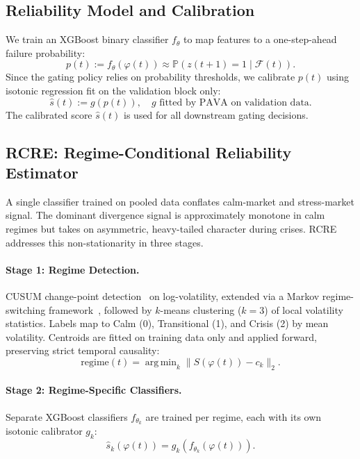 \documentclass[sigconf, anonymous]{acmart}
\begin{document}
\subsection{Reliability Model and Calibration}
We train an XGBoost binary classifier $f_{\theta}$ to map features to a one-step-ahead failure probability:
\begin{equation}
p(t) := f_{\theta}(\varphi(t)) \approx \mathbb{P}(z(t + 1) = 1 \mid \mathcal{F}(t)).
\end{equation}
Since the gating policy relies on probability thresholds, we calibrate $p(t)$ using isotonic regression fit on the validation block only:
\begin{equation}
\hat{s}(t) := g(p(t)), \quad g \text{ fitted by PAVA on validation data.}
\end{equation}
The calibrated score $\hat{s}(t)$ is used for all downstream gating decisions.

\subsection{RCRE: Regime-Conditional Reliability Estimator}
A single classifier trained on pooled data conflates calm-market and stress-market signal. The dominant divergence signal is approximately monotone in calm regimes but takes on asymmetric, heavy-tailed character during crises. RCRE addresses this non-stationarity in three stages.

\paragraph{Stage 1: Regime Detection.} CUSUM change-point detection~\cite{killick2012optimal} on log-volatility, extended via a Markov regime-switching framework~\cite{hamilton1989new}, followed by $k$-means clustering ($k = 3$) of local volatility statistics. Labels map to Calm (0), Transitional (1), and Crisis (2) by mean volatility. Centroids are fitted on training data only and applied forward, preserving strict temporal causality:
\begin{equation}
\text{regime}(t) = \operatorname{arg\,min}_k \| S(\varphi(t)) - c_k \|_2.
\end{equation}

\paragraph{Stage 2: Regime-Specific Classifiers.} Separate XGBoost classifiers $f_{\theta_k}$ are trained per regime, each with its own isotonic calibrator $g_k$:
\begin{equation}
\hat{s}_k(\varphi(t)) = g_k(f_{\theta_k}(\varphi(t))).
\end{equation}
\end{document}
